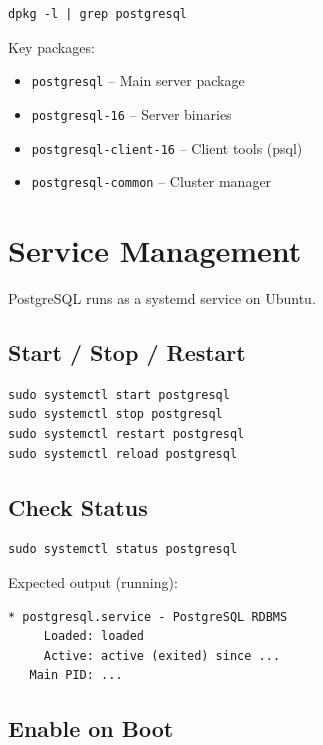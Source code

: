 \documentclass[11pt,a4paper]{article}
\begin{document}
\begin{lstlisting}[style=shell]
dpkg -l | grep postgresql
\end{lstlisting}

Key packages:
\begin{itemize}[noitemsep]
    \item \texttt{postgresql} -- Main server package
    \item \texttt{postgresql-16} -- Server binaries
    \item \texttt{postgresql-client-16} -- Client tools (psql)
    \item \texttt{postgresql-common} -- Cluster manager
\end{itemize}

\section{Service Management}

PostgreSQL runs as a systemd service on Ubuntu.

\subsection{Start / Stop / Restart}

\begin{lstlisting}[style=shell]
sudo systemctl start postgresql
sudo systemctl stop postgresql
sudo systemctl restart postgresql
sudo systemctl reload postgresql
\end{lstlisting}

\subsection{Check Status}

\begin{lstlisting}[style=shell]
sudo systemctl status postgresql
\end{lstlisting}

Expected output (running):
\begin{lstlisting}[style=shell]
* postgresql.service - PostgreSQL RDBMS
     Loaded: loaded
     Active: active (exited) since ...
   Main PID: ...
\end{lstlisting}

\subsection{Enable on Boot}
\end{document}
